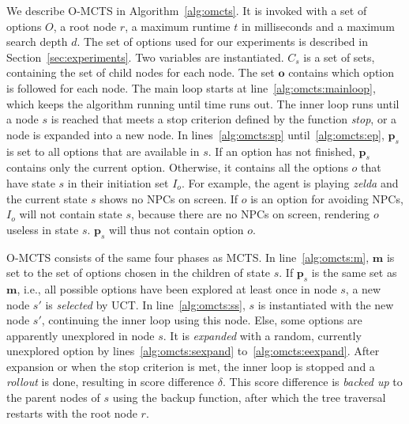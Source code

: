 We describe O-MCTS in Algorithm~\ref{alg:omcts}. It is invoked with a set of
options $O$, a root node $r$, a maximum runtime $t$ in milliseconds and a
maximum search depth $d$. The set of options used for our experiments is
described in Section~\ref{sec:experiments}. Two variables are instantiated.
$C_s$ is a set of sets, containing the set of child nodes for each node. The set
$\mathbf{o}$ contains which option is followed for each node. The main loop
starts at line~\ref{alg:omcts:mainloop}, which keeps the algorithm running until
time runs out.  The inner loop runs until a node $s$ is reached that meets a
stop criterion defined by the function \emph{stop}, or a node is expanded into a
new node.  In lines~\ref{alg:omcts:sp} until~\ref{alg:omcts:ep}, $\mathbf{p}_s$
is set to all options that are available in $s$. If an option has not finished,
$\mathbf{p}_s$ contains only the current option. Otherwise, it contains all the
options $o$ that have state $s$ in their initiation set $I_o$. For example, the
agent is playing \textit{zelda} and the current state $s$ shows no NPCs on
screen. If $o$ is an option for avoiding NPCs, $I_o$ will not contain state $s$,
because there are no NPCs on screen, rendering $o$ useless in state $s$.
$\mathbf{p}_s$ will thus not contain option $o$.

O-MCTS consists of the same four phases as MCTS\@. In line~\ref{alg:omcts:m},
$\mathbf{m}$ is set to the set of options chosen in the children of state $s$.
If $\mathbf{p}_s$ is the same set as $\mathbf{m}$, i.e., all possible options
have been explored at least once in node $s$, a new node $s'$ is \emph{selected}
by UCT\@. In line~\ref{alg:omcts:ss}, $s$ is instantiated with the new
node $s'$, continuing the inner loop using this node.  Else, some options are
apparently unexplored in node $s$. It is \emph{expanded} with a random,
currently unexplored option by lines~\ref{alg:omcts:sexpand}
to~\ref{alg:omcts:eexpand}. After expansion or when the stop criterion is met,
the inner loop is stopped and a \emph{rollout} is done, resulting in score
difference $\delta$. This score difference is \emph{backed up} to the parent
nodes of $s$ using the backup function, after which the tree traversal restarts
with the root node $r$.

